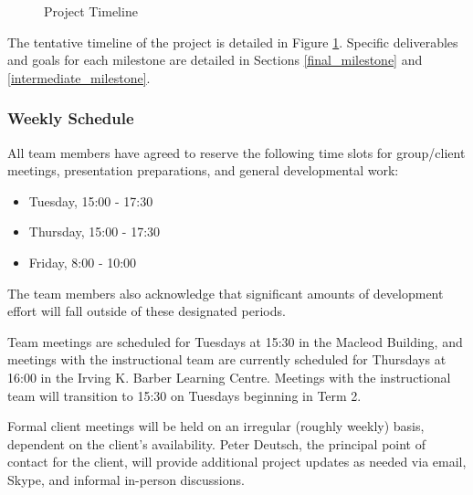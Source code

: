 \begin{figure}[H]
       \caption{Project Timeline}\label{fig:timeline}
\end{figure}

The tentative timeline of the project is detailed in Figure \ref{fig:timeline}. Specific deliverables and goals for each milestone are detailed in Sections \ref{final_milestone} and \ref{intermediate_milestone}.

\subsubsection{Weekly Schedule}

All team members have agreed to reserve the following time slots for group/client meetings, presentation preparations, and general developmental work:
\begin{itemize}
\item Tuesday, 15:00 - 17:30
\item Thursday, 15:00 - 17:30
\item Friday, 8:00 - 10:00
\end{itemize}

The team members also acknowledge that significant amounts of development effort will fall outside of these designated periods.

Team meetings are scheduled for Tuesdays at 15:30 in the Macleod Building, and meetings with the instructional team are currently scheduled for Thursdays at 16:00 in the Irving K. Barber Learning Centre. Meetings with the instructional team will transition to 15:30 on Tuesdays beginning in Term 2.

Formal client meetings will be held on an irregular (roughly weekly) basis, dependent on the client's availability. Peter Deutsch, the principal point of contact for the client, will provide additional project updates as needed via email, Skype, and informal in-person discussions.